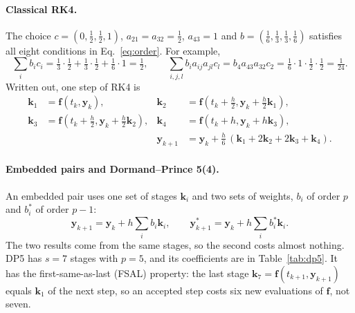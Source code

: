 \paragraph{Classical RK4.} The choice $c=(0,\tfrac12,\tfrac12,1)$, $a_{21}=a_{32}=\tfrac12$, $a_{43}=1$ and $b=(\tfrac16,\tfrac13,\tfrac13,\tfrac16)$ satisfies all eight conditions in Eq.~\eqref{eq:order}. For example,
\[
\textstyle\sum_i b_ic_i=\tfrac13\cdot\tfrac12+\tfrac13\cdot\tfrac12+\tfrac16\cdot1=\tfrac12,\qquad
\sum_{i,j,l} b_ia_{ij}a_{jl}c_l=b_4a_{43}a_{32}c_2=\tfrac16\cdot1\cdot\tfrac12\cdot\tfrac12=\tfrac1{24}.
\]
Written out, one step of RK4 is
\begin{equation}
\begin{aligned}
\mathbf{k}_1&=\mathbf{f}(t_k,\mathbf{y}_k), &
\mathbf{k}_2&=\mathbf{f}(t_k+\tfrac h2,\mathbf{y}_k+\tfrac h2\mathbf{k}_1),\\
\mathbf{k}_3&=\mathbf{f}(t_k+\tfrac h2,\mathbf{y}_k+\tfrac h2\mathbf{k}_2), &
\mathbf{k}_4&=\mathbf{f}(t_k+h,\mathbf{y}_k+h\mathbf{k}_3),\\
&&\mathbf{y}_{k+1}&=\mathbf{y}_k+\tfrac h6\,(\mathbf{k}_1+2\mathbf{k}_2+2\mathbf{k}_3+\mathbf{k}_4).
\end{aligned}
\end{equation}

\paragraph{Embedded pairs and Dormand--Prince 5(4).} An embedded pair uses one set of stages $\mathbf{k}_i$ and two sets of weights, $b_i$ of order $p$ and $b_i^{*}$ of order $p-1$:
\begin{equation}
\mathbf{y}_{k+1}=\mathbf{y}_k+h\sum_i b_i\mathbf{k}_i,\qquad
\mathbf{y}^{*}_{k+1}=\mathbf{y}_k+h\sum_i b^{*}_i\mathbf{k}_i .
\end{equation}
The two results come from the same stages, so the second costs almost nothing. DP5 \cite{dormand1980} has $s=7$ stages with $p=5$, and its coefficients are in Table~\ref{tab:dp5}. It has the first-same-as-last (FSAL) property: the last stage $\mathbf{k}_7=\mathbf{f}(t_{k+1},\mathbf{y}_{k+1})$ equals $\mathbf{k}_1$ of the next step, so an accepted step costs six new evaluations of $\mathbf{f}$, not seven.

